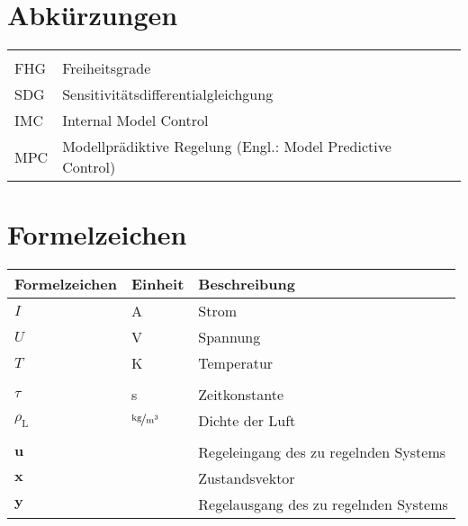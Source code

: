 
\section*{Abkürzungen}

\begin{flushleft}
\begin{tabularx}{\textwidth}{XlX}	
	&&\\
	FHG								&Freiheitsgrade&\\
	SDG								&Sensitivitätsdifferentialgleichgung&\\
	IMC								&Internal Model Control&\\
	MPC								&Modellprädiktive Regelung (Engl.: Model Predictive Control)&
\end{tabularx}
\end{flushleft}


\vspace{20mm}
\section*{Formelzeichen}


\begin{flushleft}
\begin{tabularx}{\textwidth}{llX}
	\toprule
	Formelzeichen					 	& Einheit									& Beschreibung \\
	\midrule
	$I$											&	A												&	Strom \\
	$U$											&	V												&	Spannung \\
	$T$											&	K												&	Temperatur \\
	&&\\
	$\tau$									&	s												& Zeitkonstante \\
	$\rho_{\mathrm{L}}$			&	$\unitfrac[]{kg}{m^3}$	& Dichte der Luft \\
	&&\\
	$\boldsymbol{u}$						& 												&	Regeleingang des zu regelnden Systems \\
	$\boldsymbol{x}$						& 												&	Zustandsvektor \\
	$\boldsymbol{y}$						& 												&	Regelausgang des zu regelnden Systems \\
\bottomrule
\end{tabularx}
\end{flushleft}
